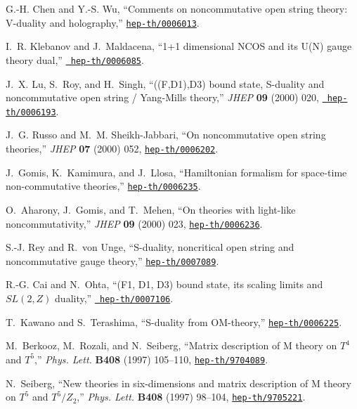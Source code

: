 \documentclass[a4paper,twoside,titlepage,12pt]{article}
\begin{document}
\begin{thebibliography}{10}
G.-H. Chen and Y.-S. Wu, ``Comments on noncommutative open string theory:
  {V-duality} and holography,''
  \href{http://xxx.lanl.gov/abs/hep-th/0006013}{{\tt hep-th/0006013}}.

I.~R. Klebanov and J.~Maldacena, ``1+1 dimensional {NCOS} and its {U(N)} gauge
  theory dual,'' \href{http://xxx.lanl.gov/abs/hep-th/0006085}{{\tt
  hep-th/0006085}}.

J.~X. Lu, S.~Roy, and H.~Singh, ``{((F,D1),D3)} bound state, {S-duality} and
  noncommutative open string / {Yang-Mills} theory,'' {\em JHEP} {\bf 09}
  (2000) 020, \href{http://xxx.lanl.gov/abs/hep-th/0006193}{{\tt
  hep-th/0006193}}.

J.~G. Russo and M.~M. Sheikh-Jabbari, ``On noncommutative open string
  theories,'' {\em JHEP} {\bf 07} (2000) 052,
  \href{http://xxx.lanl.gov/abs/hep-th/0006202}{{\tt hep-th/0006202}}.

J.~Gomis, K.~Kamimura, and J.~Llosa, ``Hamiltonian formalism for space-time
  non-commutative theories,''
  \href{http://xxx.lanl.gov/abs/hep-th/0006235}{{\tt hep-th/0006235}}.

O.~Aharony, J.~Gomis, and T.~Mehen, ``On theories with light-like
  noncommutativity,'' {\em JHEP} {\bf 09} (2000) 023,
  \href{http://xxx.lanl.gov/abs/hep-th/0006236}{{\tt hep-th/0006236}}.

S.-J. Rey and R.~von Unge, ``{S-duality}, noncritical open string and
  noncommutative gauge theory,''
  \href{http://xxx.lanl.gov/abs/hep-th/0007089}{{\tt hep-th/0007089}}.

R.-G. Cai and N.~Ohta, ``{(F1, D1, D3)} bound state, its scaling limits and
  {$SL(2,Z)$} duality,'' \href{http://xxx.lanl.gov/abs/hep-th/0007106}{{\tt
  hep-th/0007106}}.

T.~Kawano and S.~Terashima, ``{S}-duality from {OM}-theory,''
  \href{http://xxx.lanl.gov/abs/hep-th/0006225}{{\tt hep-th/0006225}}.

M.~Berkooz, M.~Rozali, and N.~Seiberg, ``Matrix description of {M} theory on
  {$T^4$} and {$T^5$},'' {\em Phys. Lett.} {\bf B408} (1997) 105--110,
  \href{http://xxx.lanl.gov/abs/hep-th/9704089}{{\tt hep-th/9704089}}.

N.~Seiberg, ``New theories in six-dimensions and matrix description of {M}
  theory on {$T^5$} and {$T^5/Z_2$},'' {\em Phys. Lett.} {\bf B408} (1997)
  98--104, \href{http://xxx.lanl.gov/abs/hep-th/9705221}{{\tt hep-th/9705221}}.


\end{thebibliography}
\end{document}
